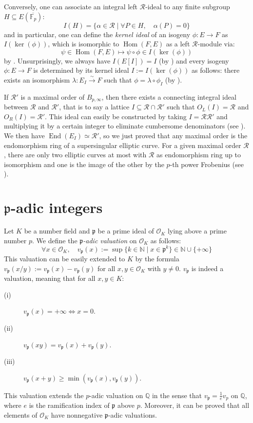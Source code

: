 \documentclass[a4paper,10pt]{report}
\theoremstyle{definition}
\theoremstyle{plain}
\theoremstyle{definition}
\newcommand{\N}{\mathbb{N}}
\newcommand{\Q}{\mathbb{Q}}
\newcommand{\F}{\mathbb{F}}
\newcommand{\m}[1]{\mathcal{#1}}
\newcommand{\mO}{\mathcal{O}}
\renewcommand{\(}{\left(}
\renewcommand{\)}{\right)}
\newcommand{\mf}[1]{\mathfrak{#1}}
\DeclareMathOperator{\Hom}{Hom}
\DeclareMathOperator{\End}{End}
\begin{document}
Conversely, one can associate an integral left $\m{R}$-ideal to any finite subgroup $H\subseteq E(\overline{\F_p})$:
\[I(H)=\{\alpha\in\m{R}\mid\forall P\in H, \quad \alpha(P)=0\}\]
and in particular, one can define the \emph{kernel ideal} of an isogeny $\phi : E\longrightarrow F$ as $I(\ker(\phi))$, which is isomorphic to $\Hom(F,E)$ as a left $\m{R}$-module via:
\[\psi\in\Hom(F,E) \longmapsto \psi\circ\phi\in I(\ker(\phi)) \]
by \cite[lemma 42.2.7]{Voight}. Unsurprisingly, we always have $I(E[I])=I$ (by \cite[proposition 42.2.16.(b)]{Voight}) and every isogeny $\phi :E\longrightarrow F$ is determined by its kernel ideal $I:=I(\ker(\phi))$ as follows: there exists an isomorphism $\lambda : E_I\overset{\sim}{\longrightarrow} F$ such that $\phi=\lambda\circ\phi_I$ (by \cite[corollary 42.2.21]{Voight}).

If $\m{R}'$ is a maximal order of $B_{p,\infty}$, then there exists a connecting integral ideal between $\m{R}$ and $\m{R}'$, that is to say a lattice $I\subseteq \m{R}\cap\m{R}'$ such that $O_L(I)=\m{R}$ and $O_R(I)=\m{R}'$. This ideal can easily be constructed by taking $I=\m{R}\m{R}'$ and multiplying it by a certain integer to eliminate cumbersome denominators (see \cite[lemma 17.4.7]{Voight}). We then have $\End(E_I)\simeq\m{R}'$, so we just proved that any maximal order is the endomorphism ring of a supersingular elliptic curve. For a given maximal order $\m{R}$, there are only two elliptic curves at most with $\m{R}$ as endomorphism ring up to isomorphism and one is the image of the other by the $p$-th power Frobenius (see \cite[lemma 42.4.1]{Voight}).   

\section{$\mf{p}$-adic integers}

Let $K$ be a number field and $\mf{p}$ be a prime ideal of $\mO_K$ lying above a prime number $p$. We define the \emph{$\mf{p}$-adic valuation} on $\mO_K$ as follows:
\[\forall x\in\mO_K, \quad v_{\mf{p}}(x):=\sup\{k\in\N\mid x\in\mf{p}^k\}\in\N\cup\{+\infty\}\]
This valuation can be easily extended to $K$ by the formula $v_{\mf{p}}(x/y):=v_{\mf{p}}(x)-v_{\mf{p}}(y)$ for all $x,y\in\mO_K$ with $y\neq 0$.  $v_{\mf{p}}$ is indeed a valuation, meaning that for all $x,y\in K$:
\begin{description}
\item[(i)] $v_{\mf{p}}(x)=+\infty\Longleftrightarrow x=0$.
\item[(ii)] $v_{\mf{p}}(xy)=v_{\mf{p}}(x)+v_{\mf{p}}(y)$.
\item[(iii)] $v_{\mf{p}}(x+y)\geq\min(v_{\mf{p}}(x),v_{\mf{p}}(y))$.
\end{description}
This valuation extends the $p$-adic valuation on $\Q$ in the sense that $v_{\mf{p}}=\frac{1}{e}v_p$ on $\Q$, where $e$ is the ramification index of $\mf{p}$ above $p$. Moreover, it can be proved that all elements of $\mO_K$ have nonnegative $\mf{p}$-adic valuations.  
\end{document}
